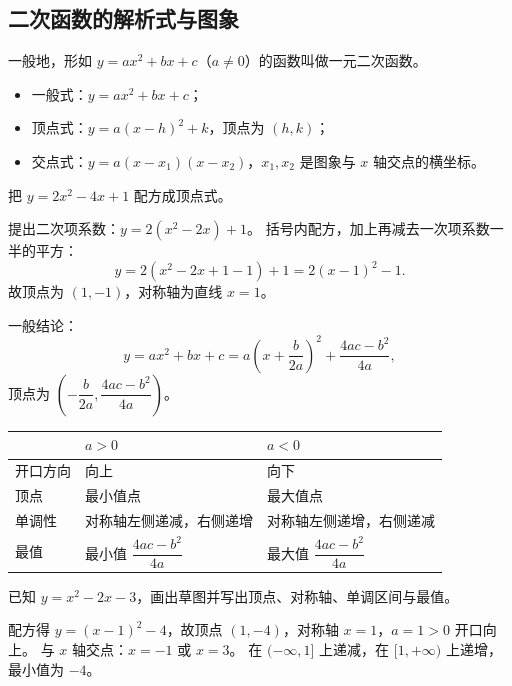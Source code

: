 \begin{explore}

\subsection{二次函数的解析式与图象}

一般地，形如 $y=ax^2+bx+c$（$a\neq0$）的函数叫做一元二次函数。
\begin{itemize}
  \item 一般式：$y=ax^2+bx+c$；
  \item 顶点式：$y=a(x-h)^2+k$，顶点为 $(h,k)$；
  \item 交点式：$y=a(x-x_1)(x-x_2)$，$x_1,x_2$ 是图象与 $x$ 轴交点的横坐标。
\end{itemize}

\begin{example}
把 $y=2x^2-4x+1$ 配方成顶点式。
\end{example}
\begin{solution}
提出二次项系数：$y=2(x^2-2x)+1$。
括号内配方，加上再减去一次项系数一半的平方：
\[
  y=2(x^2-2x+1-1)+1=2(x-1)^2-1.
\]
故顶点为 $(1,-1)$，对称轴为直线 $x=1$。
\end{solution}

一般结论：
\[
  y=ax^2+bx+c=a\left(x+\frac{b}{2a}\right)^2+\frac{4ac-b^2}{4a},
\]
顶点为 $\left(-\dfrac{b}{2a},\dfrac{4ac-b^2}{4a}\right)$。

\begin{center}
\footnotesize
\setlength{\tabcolsep}{3pt}
\renewcommand{\arraystretch}{1.4}
\begin{tabular}{p{2.6cm}p{4.8cm}p{4.8cm}}
\toprule
 & $a>0$ & $a<0$ \\
\midrule
开口方向 & 向上 & 向下 \\
顶点 & 最小值点 & 最大值点 \\
单调性 & 对称轴左侧递减，右侧递增 & 对称轴左侧递增，右侧递减 \\
最值 & 最小值 $\dfrac{4ac-b^2}{4a}$ & 最大值 $\dfrac{4ac-b^2}{4a}$ \\
\bottomrule
\end{tabular}
\end{center}

\begin{problem}
已知 $y=x^2-2x-3$，画出草图并写出顶点、对称轴、单调区间与最值。
\end{problem}
\begin{solution}
配方得 $y=(x-1)^2-4$，故顶点 $(1,-4)$，对称轴 $x=1$，$a=1>0$ 开口向上。
与 $x$ 轴交点：$x=-1$ 或 $x=3$。
在 $(-\infty,1]$ 上递减，在 $[1,+\infty)$ 上递增，最小值为 $-4$。
\end{solution}


\end{explore}
